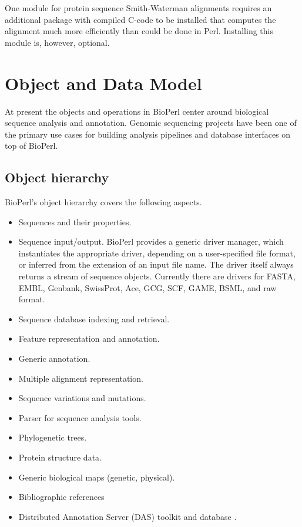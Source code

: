 \documentclass{article}
\begin{document}
\begin{twocolumn}
One module for protein sequence Smith-Waterman alignments requires an
additional package with compiled C-code to be installed that computes
the alignment much more efficiently than could be done in
Perl.  Installing this module is, however, optional.

\section{Object and Data Model}

At present the objects and operations in BioPerl center around
biological sequence analysis and annotation.  Genomic sequencing
projects have been one of the primary use cases for building analysis
pipelines and database interfaces on top of BioPerl. 

\subsection{Object hierarchy}

BioPerl's object hierarchy covers the following aspects.
\begin{itemize}
\item Sequences and their properties.
\item Sequence input/output.  BioPerl provides a generic driver
manager, which instantiates the appropriate driver, depending on a
user-specified file format, or inferred from the extension of an input
file name.  The driver itself always returns a stream of sequence
objects.  Currently there are drivers for FASTA, EMBL, Genbank, SwissProt,
Ace, GCG, SCF, GAME, BSML, and raw format.
\item Sequence database indexing and retrieval. 
\item Feature representation and annotation.
\item Generic annotation.
\item Multiple alignment representation.
\item Sequence variations and mutations.
\item Parser for sequence analysis tools.
\item Phylogenetic trees.
\item Protein structure data.
\item Generic biological maps (genetic, physical).
\item Bibliographic references
\item Distributed Annotation Server (DAS) toolkit and database \cite{das}.
\end{itemize}


\end{twocolumn}
\end{document}
